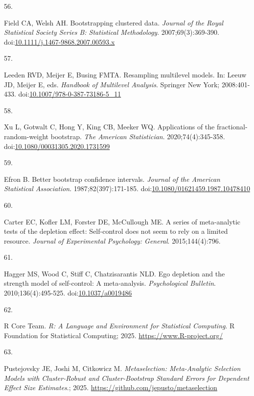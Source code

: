 \documentclass[
  man, donotrepeattitle,floatsintext]{apa7}
\newlength{\cslhangindent}
\newlength{\csllabelwidth}
\newenvironment{CSLReferences}[2] %
 {\begin{list}{}{%
  \setlength{\itemindent}{0pt}
  \setlength{\leftmargin}{0pt}
  \setlength{\parsep}{0pt}
  \ifodd #1
   \setlength{\leftmargin}{\cslhangindent}
   \setlength{\itemindent}{-1\cslhangindent}
  \fi
  \setlength{\itemsep}{#2\baselineskip}}}
 {\end{list}}
\newcommand{\CSLLeftMargin}[1]{\parbox[t]{\csllabelwidth}{\strut#1\strut}}
\newcommand{\CSLRightInline}[1]{\parbox[t]{\linewidth - \csllabelwidth}{\strut#1\strut}}
\begin{document}
\begin{CSLReferences}{0}{1}
\CSLLeftMargin{56. }%
\CSLRightInline{Field CA, Welsh AH. Bootstrapping clustered data. \emph{Journal of the Royal Statistical Society Series B: Statistical Methodology}. 2007;69(3):369-390. doi:\href{https://doi.org/10.1111/j.1467-9868.2007.00593.x}{10.1111/j.1467-9868.2007.00593.x}}

\CSLLeftMargin{57. }%
\CSLRightInline{Leeden RVD, Meijer E, Busing FMTA. Resampling multilevel models. In: Leeuw JD, Meijer E, eds. \emph{Handbook of {Multilevel} {Analysis}}. Springer New York; 2008:401-433. doi:\href{https://doi.org/10.1007/978-0-387-73186-5_11}{10.1007/978-0-387-73186-5\_11}}

\CSLLeftMargin{58. }%
\CSLRightInline{Xu L, Gotwalt C, Hong Y, King CB, Meeker WQ. Applications of the fractional-random-weight bootstrap. \emph{The American Statistician}. 2020;74(4):345-358. doi:\href{https://doi.org/10.1080/00031305.2020.1731599}{10.1080/00031305.2020.1731599}}

\CSLLeftMargin{59. }%
\CSLRightInline{Efron B. Better bootstrap confidence intervals. \emph{Journal of the American Statistical Association}. 1987;82(397):171-185. doi:\href{https://doi.org/10.1080/01621459.1987.10478410}{10.1080/01621459.1987.10478410}}

\CSLLeftMargin{60. }%
\CSLRightInline{Carter EC, Kofler LM, Forster DE, McCullough ME. A series of meta-analytic tests of the depletion effect: Self-control does not seem to rely on a limited resource. \emph{Journal of Experimental Psychology: General}. 2015;144(4):796.}

\CSLLeftMargin{61. }%
\CSLRightInline{Hagger MS, Wood C, Stiff C, Chatzisarantis NLD. Ego depletion and the strength model of self-control: {A} meta-analysis. \emph{Psychological Bulletin}. 2010;136(4):495-525. doi:\href{https://doi.org/10.1037/a0019486}{10.1037/a0019486}}

\CSLLeftMargin{62. }%
\CSLRightInline{R Core Team. \emph{R: A Language and Environment for Statistical Computing}. R Foundation for Statistical Computing; 2025. \url{https://www.R-project.org/}}

\CSLLeftMargin{63. }%
\CSLRightInline{Pustejovsky JE, Joshi M, Citkowicz M. \emph{Metaselection: Meta-Analytic Selection Models with Cluster-Robust and Cluster-Bootstrap Standard Errors for Dependent Effect Size Estimates}.; 2025. \url{https://github.com/jepusto/metaselection}}


\end{CSLReferences}
\end{document}
